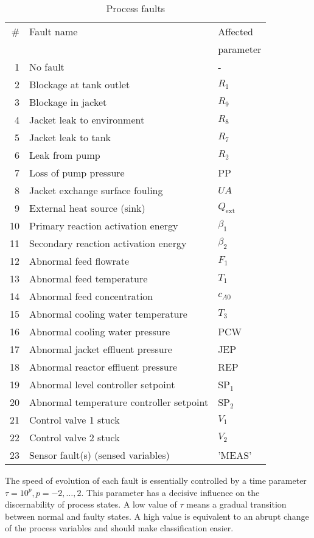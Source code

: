 \documentclass[10pt, conference, compsocconf]{IEEEtran}
\begin{document}
\begin{table}[htb!]
\begin{center}
\caption{Process faults}
\begin{tabular}{ r l l }
\hline
{\#} & Fault name &  Affected \\
     &            &  parameter \\
\hline
1	&	No fault	&	- \\
2	&	Blockage at tank outlet	&		$R_{1}$ \\
3	&	Blockage in jacket &			$R_{9}$	\\
4	&	Jacket leak to environment	 &	$R_{8}$\\
5	&	Jacket leak to tank	 &		$R_{7}$\\
6	&	Leak from pump	 &			$R_{2}$\\
7	&	Loss of pump pressure	 &		PP\\
8	&	Jacket exchange surface fouling	 &	$UA$\\
9	&	External heat source (sink)	 &	$Q_{\text{ext}}$ \\
10	&	Primary reaction activation energy &	$\beta_{1}$\\
11	&	Secondary reaction activation energy &	$\beta_{2}$\\
12	&	Abnormal feed flowrate	 &		$F_{1}$\\
13	&	Abnormal feed temperature	 &	$T_{1}$\\
14	&	Abnormal feed concentration	 &	$c_{A0}$\\
15	&	Abnormal cooling water temperature &	$T_{3}$	\\
16	&	Abnormal cooling water pressure	 &	PCW\\
17	&	Abnormal jacket effluent pressure &	JEP\\
18	&	Abnormal reactor effluent pressure &	REP\\
19	&	Abnormal level controller setpoint &	SP$_{1}$\\
20	&	Abnormal temperature controller setpoint &	SP$_{2}$\\
21	&	Control valve 1	stuck	 &		$V_{1}$\\
22	&	Control valve 2 stuck	 &		$V_{2}$\\
23	&	Sensor fault(s) (sensed variables)	 &'MEAS'\\
\hline
\end{tabular}
\label{tab:faults}
\end{center}
\end{table}
The speed of evolution of each fault is essentially
controlled by a time parameter $\tau=10^{p}, p=-2,\ldots,2$.
This parameter has a decisive influence on the discernability
of process states. A low value of $\tau$ means a gradual transition
between normal and faulty states. A high value is equivalent to
an abrupt change of the process variables and should make classification
easier.
\end{document}

